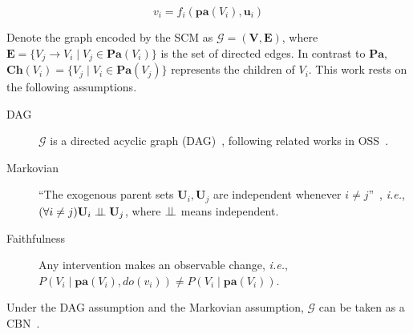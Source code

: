\begin{equation}\label{eqn:scm}
	v_{i} = f_{i}(\mathbf{pa}(V_{i}), \mathbf{u}_{i})
\end{equation}

Denote the graph encoded by the SCM as $\mathcal{G} = (\mathbf{V}, \mathbf{E})$, where $\mathbf{E} = \{V_{j} \to V_{i} \mid V_{j} \in \mathbf{Pa}(V_{i})\}$ is the set of directed edges.
In contrast to $\mathbf{Pa}$, $\mathbf{Ch}(V_{i}) = \{V_{j} \mid V_{i} \in \mathbf{Pa}(V_{j})\}$ represents the children of $V_{i}$.
This work rests on the following assumptions.
\begin{description}
    \item[DAG] $\mathcal{G}$ is a directed acyclic graph (DAG)~\cite{Pearl:2009}, following related works in OSS~\cite{Chen:2014,Wang:2018,Gan:2021}.
    \item[Markovian] ``The exogenous parent sets $\mathbf{U}_{i}, \mathbf{U}_{j}$ are independent whenever $i \neq j$''~\cite{Bareinboim:2022}, \textit{i.e.}, $(\forall i \neq j) \mathbf{U}_{i} \perp\!\!\!\perp \mathbf{U}_{j}$, where $\perp\!\!\!\perp$ means independent.
    \item[Faithfulness~\cite{Pearl:2009}] Any intervention makes an observable change, \textit{i.e.}, $P(V_{i} \mid \mathbf{pa}(V_{i}), do(v_{i})) \neq P(V_{i} \mid \mathbf{pa}(V_{i}))$.
\end{description}
Under the DAG assumption and the Markovian assumption, $\mathcal{G}$ can be taken as a CBN~\cite{Bareinboim:2022}.

